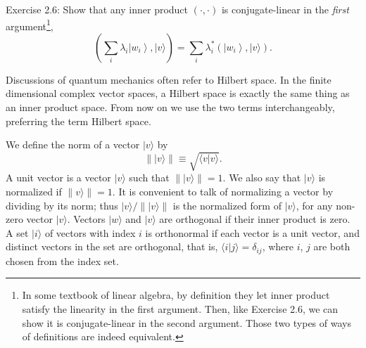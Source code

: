 
\begin{exercise}
    Exercise 2.6: Show that any inner product $(\cdot, \cdot)$ is conjugate-linear in the \textit{first} argument\footnote{In some textbook of linear algebra, by definition they let inner product satisfy the linearity in the first argument. Then, like Exercise 2.6, we can show it is conjugate-linear in the second argument. Those two types of ways of definitions are indeed equivalent. },
\begin{equation}
    \left(\sum_{i} \lambda_{i}\left|w_{i}\right\rangle,|v\rangle\right)=\sum_{i} \lambda_{i}^{*}\left(\left|w_{i}\right\rangle,|v\rangle\right) .
\end{equation}
\end{exercise}

Discussions of quantum mechanics often refer to Hilbert space. In the finite dimensional complex vector spaces, a Hilbert space is exactly the same thing as an inner product space. From now on we use the two terms interchangeably, preferring the term Hilbert space.


We define the norm of a vector $|v\rangle$ by
\begin{equation}
    \||v\rangle \| \equiv \sqrt{\langle v | v\rangle}.
\end{equation}
A unit vector is a vector $|v\rangle$ such that $\||v\rangle \|=1$. We also say that $|v\rangle$ is normalized if $\| v\rangle \|=1$. It is convenient to talk of normalizing a vector by dividing by its norm; thus $|v\rangle / \||v\rangle \|$ is the normalized form of $|v\rangle$, for any non-zero vector $|v\rangle$. 
Vectors $|w\rangle$ and $|v\rangle$ are orthogonal if their inner product is zero. A set $|i\rangle$ of vectors with index $i$ is orthonormal if each vector is a unit vector, and distinct vectors in the set are orthogonal, that is, $\langle i | j\rangle=\delta_{i j}$, where $i$, $j$ are both chosen from the index set.


